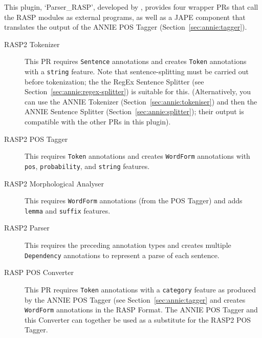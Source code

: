 This plugin, `Parser\_RASP', developed by
, provides four
wrapper PRs that call the RASP modules as external programs, as well
as a JAPE component that translates the output of the ANNIE POS Tagger
(Section~\ref{sec:annie:tagger}).
%
\begin{description}
\item[RASP2 Tokenizer] This PR requires \texttt{Sentence} annotations
  and creates \texttt{Token} annotations with a \texttt{string}
  feature.  Note that sentence-splitting must be carried out before
  tokenization; the the RegEx Sentence Splitter (see
  Section~\ref{sec:annie:regex-splitter}) is suitable for this.
  (Alternatively, you can use the ANNIE Tokenizer
  (Section~\ref{sec:annie:tokeniser}) and then the ANNIE Sentence Splitter
  (Section~\ref{sec:annie:splitter}); their output is compatible with the
  other PRs in this plugin).
\item[RASP2 POS Tagger] This requires \texttt{Token} annotations and
  creates \texttt{WordForm} annotations with \texttt{pos},
  \texttt{probability}, and \texttt{string} features.
\item[RASP2 Morphological Analyser] This requires \texttt{WordForm}
  annotations (from the POS Tagger) and adds \texttt{lemma} and
  \texttt{suffix} features.
\item[RASP2 Parser] This requires the preceding annotation types and
  creates multiple \texttt{Dependency} annotations to represent a
  parse of each sentence.
\item[RASP POS Converter] This PR requires \texttt{Token} annotations
  with a \texttt{category} feature as produced by the ANNIE POS Tagger
  (see Section~\ref{sec:annie:tagger} and creates \texttt{WordForm}
  annotations in the RASP Format.  The ANNIE POS Tagger and this
  Converter can together be used as a substitute for the RASP2 POS
  Tagger.
\end{description}


